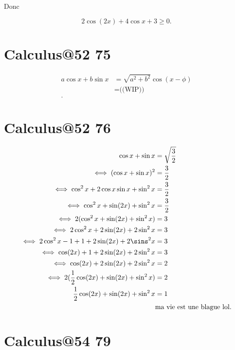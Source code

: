 \documentclass{article}
\newcommand{\R}{\mathbb{R}}
\begin{document}
Donc

\[
	2\cos(2x)+4\cos x + 3 \ge 0
.\] 


\section{Calculus@52 75} %

\begin{align*}
	a\cos x + b\sin x &= \sqrt{a^2+b^2} \cos(x-\phi) \\
			  &= \text{((WIP))} \\
.\end{align*}


\section{Calculus@52 76} %

\begin{align*}
	\cos x + \sin x &= \sqrt{\frac{3}{2}}  \\
	\iff (\cos x + \sin x)^2 &= \frac{3}{2} \\
	\iff \cos^2x + 2\cos x \sin x + \sin^2x &= \frac{3}{2} \\
	\iff \cos^2x + \sin(2x) + \sin^2x &= \frac{3}{2} \\
	\iff 2(\cos^2x+ \sin(2x) + \sin^2x) &=  3 \\
	\iff 2\cos^2x + 2\sin(2x) + 2\sin^2x &= 3 \\
	\iff 2\cos^2x - 1 + 1 + 2\sin(2x) + 2\sins^2x &= 3 \\
	\iff \cos(2x) + 1 + 2\sin(2x) + 2\sin^2x &=  3 \\
	\iff \cos(2x) + 2\sin(2x) + 2\sin^2x &= 2 \\
	\iff 2(\frac{1}{2}\cos(2x) + \sin(2x) + \sin^2x) &=  2 \\
	\frac{1}{2}\cos(2x) + \sin(2x) + \sin^2x &=  1 \\
						 &\text{ma vie est une blague lol}
.\end{align*}

\section{Calculus@54 79} %
\end{document}
